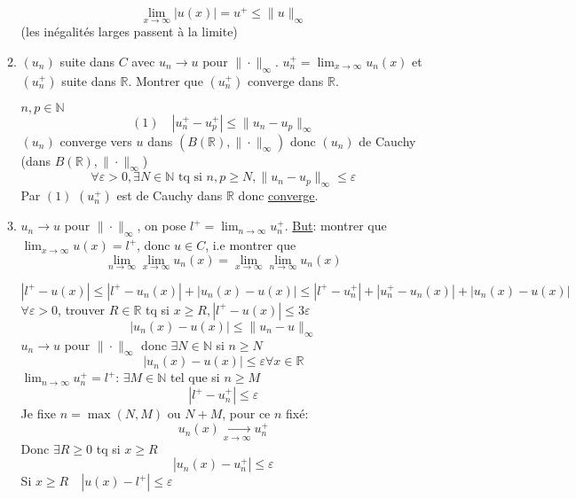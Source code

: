 \documentclass[a4paper]{article}
\newcommand{\N}{\mathbb{N}}
\newcommand{\R}{\mathbb{R}}
\begin{document}
\begin{enumerate}
\begin{enumerate}
                \[
                \lim_{x \to \infty} |u(x)| = u^+ \le \|u\|_{\infty}
                \] 
                (les inégalités larges passent à la limite)
            \item 
                $(u_n)$ suite dans  $C$ avec  $u_n \to u$ pour $\|\cdot\|_{\infty}$. $u_n^+ = \lim_{x \to \infty} u_n(x)$ et $(u_n^+)$ suite dans  $\R$. Montrer que $(u_n^+)$ converge dans  $\R$.
                \par
                $n, p \in \N$
                \[
                    (1) \quad |u_n^+ - u_p^+| \le \|u_n - u_p\|_{\infty}
                \] 
                $(u_n)$ converge vers  $u$ dans  $(B(\R), \|\cdot\|_{\infty})$ donc $(u_n)$ de  Cauchy (dans $B(\R), \|\cdot \|_{\infty}$)
                \[
                \forall \varepsilon > 0, \exists N \in \N \text{ tq si } n, p \ge N, \|u_n - u_p\|_{\infty} \le \varepsilon 
                \] 
                Par $(1)$  $(u_n^+)$ est de Cauchy dans  $\R$ donc  \underline{converge}.
            \item 
                $u_n \to u$ pour $\|\cdot\|_{\infty}$, on pose $l^+ = \lim_{n \to \infty} u_n^+$. \underline{But}: montrer que $\lim_{x \to \infty} u(x) = l^+$, donc $u \in C$, i.e montrer que 
                \[
                \lim_{n \to \infty} \lim_{x \to \infty} u_n(x) = \lim_{x \to \infty} \lim_{n \to \infty} u_n(x)
                \] 
                \par
                \[
                |l^+ - u(x)| \le |l^+ - u_n(x)| + |u_n(x) - u(x)| \le |l^+ - u_n^+| + |u_n^+ - u_n(x)| + |u_n(x) - u(x)|
                \] 
                $\forall \varepsilon > 0$, trouver $R \in \R$ tq si $x \ge R, |l^+ - u(x)| \le 3 \varepsilon$
                \[
                    |u_n(x) - u(x)| \le \|u_n - u\|_{\infty}
                \] 
                $u_n \to u$ pour $\|\cdot\|_{\infty}$ donc $\exists N \in \N$ si $n \ge N$
                \[
                |u_n(x) - u(x)| \le \varepsilon \forall x \in \R
                \] 
                $\lim_{n \to \infty} u_n^+ = l^+$: $\exists M \in \N$ tel que si $n \ge M$
                \[
                |l^+ - u_n^+| \le \varepsilon
                \] 
                Je fixe $n = \max(N, M)$ ou  $N + M$, pour ce  $n$ fixé: 
                \[
                u_n(x) \xrightarrow[x \to \infty]{} u_n^+
                \] 
                Donc $\exists R \ge 0$ tq si $x \ge R$
                \[
                |u_n(x) - u_n^+| \le \varepsilon
                \] 
                Si $x \ge R \quad |u(x) - l^+| \le \varepsilon$
        \end{enumerate}
\end{enumerate}
\end{document}
